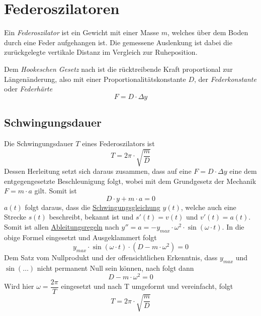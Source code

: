 \documentclass{article}
\begin{document}
 
\section{Federoszilatoren}
\begin{minipage}{\dimexpr\linewidth-4.5cm} 
 Ein \emph{Federoszilator} ist ein Gewicht mit einer Masse $m$, welches über dem Boden durch eine Feder aufgehangen ist. Die gemessene Auslenkung ist dabei die zurückgelegte vertikale Distanz im Vergleich zur Ruheposition. 
 
 Dem \emph{Hookeschen Gesetz} nach ist die rücktreibende Kraft proportional zur Längenänderung, also mit einer Proportionalitätskonstante $D$, der \emph{Federkonstante} oder \emph{Federhärte}
\[
 F = D \cdot \Delta y 
\] 
\end{minipage}
\hfill
\begin{minipage}{4.5cm}
 \center
\end{minipage} 
 
\subsection{Schwingungsdauer} 
Die Schwingungsdauer $T$ eines Federoszilators ist
\[
 T = 2\pi \cdot \sqrt{\frac{m}{D}} 
\]
Dessen Herleitung setzt sich daraus zusammen, dass auf eine $F=D \cdot \Delta y$ eine dem entgegengesetzte Beschleunigung folgt, wobei mit dem Grundgesetz der Mechanik $F=m \cdot a$ gilt. Somit ist
\[
D \cdot y + m \cdot a = 0 
\] 
$a(t)$ folgt daraus, dass die \hyperref[Mechanische Schwingungen]{Schwingungsgleichung} $y(t)$, welche auch eine Strecke $s(t)$ beschreibt, bekannt ist und $s'(t) = v(t)$ und $v'(t) = a(t)$. Somit ist allen \hyperref[Ableitungen]{Ableitungsregeln} nach $y''=a{= -y_{max} \cdot \omega^2 \cdot \sin{(\omega \cdot t)}}$. In die obige Formel eingesetzt und Ausgeklammert folgt
\[ 
 y_{max} \cdot \sin{(\omega \cdot t)} \cdot (D-m \cdot \omega^2) = 0 
\] 
Dem Satz vom Nullprodukt und der offensichtlichen Erkenntnis, dass $y_{max}$ und $\sin{(\ldots)}$ nicht permanent Null sein können, nach folgt dann
\[ 
 D-m \cdot \omega^2 = 0
\]
Wird hier $\omega = \dfrac{2\pi}{T}$ eingesetzt und nach T umgeformt und vereinfacht, folgt
\[
 \boxed{
  T = 2\pi \cdot \sqrt{\frac{m}{D}} 
 } 
\] 
 
\end{document}
